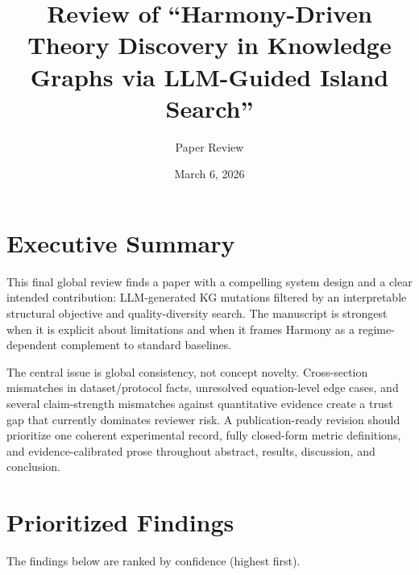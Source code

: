 \documentclass[11pt]{article}
\title{Review of ``Harmony-Driven Theory Discovery in Knowledge Graphs via LLM-Guided Island Search''}
\author{Paper Review}
\date{March 6, 2026}
\begin{document}
\maketitle

\section*{Executive Summary}
This final global review finds a paper with a compelling system design and a clear intended contribution: LLM-generated KG mutations filtered by an interpretable structural objective and quality-diversity search. The manuscript is strongest when it is explicit about limitations and when it frames Harmony as a regime-dependent complement to standard baselines.

The central issue is global consistency, not concept novelty. Cross-section mismatches in dataset/protocol facts, unresolved equation-level edge cases, and several claim-strength mismatches against quantitative evidence create a trust gap that currently dominates reviewer risk. A publication-ready revision should prioritize one coherent experimental record, fully closed-form metric definitions, and evidence-calibrated prose throughout abstract, results, discussion, and conclusion.

\section*{Prioritized Findings}
The findings below are ranked by confidence (highest first).
\end{document}
